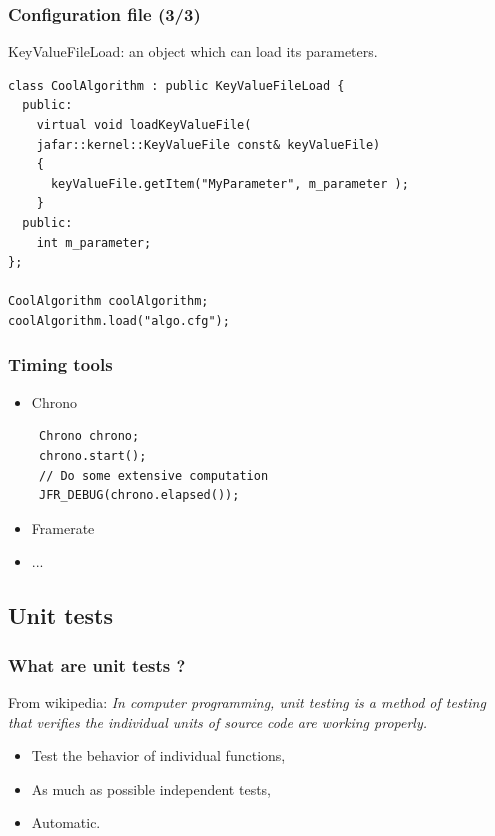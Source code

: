 \documentclass[compress]{beamer}
\begin{document}

\begin{frame}[fragile]
  \frametitle{Configuration file (3/3)}
KeyValueFileLoad: an object which can load its parameters.
 
\begin{lstlisting}
class CoolAlgorithm : public KeyValueFileLoad {
  public:
    virtual void loadKeyValueFile(
    jafar::kernel::KeyValueFile const& keyValueFile)
    {
      keyValueFile.getItem("MyParameter", m_parameter );
    }
  public:
    int m_parameter;
};

CoolAlgorithm coolAlgorithm;
coolAlgorithm.load("algo.cfg");
\end{lstlisting}
 
\end{frame}


\begin{frame}[fragile]
  \frametitle{Timing tools}
  \begin{itemize}
    \item<1-> Chrono
\begin{lstlisting}
 Chrono chrono;
 chrono.start();
 // Do some extensive computation
 JFR_DEBUG(chrono.elapsed());
\end{lstlisting}
    \item<2-> Framerate
		\item<3-> ...
  \end{itemize}

\end{frame}



\subsection{Unit tests}

\begin{frame}
  \frametitle{What are unit tests ?}
  From wikipedia: \textit{In computer programming, unit testing is a method of
testing that verifies the individual units of source code are working properly.}

  \begin{itemize}
    \item<1-> Test the behavior of individual functions,
    \item<2-> As much as possible independent tests,
    \item<3-> Automatic.
  \end{itemize}

\end{frame}
\end{document}
